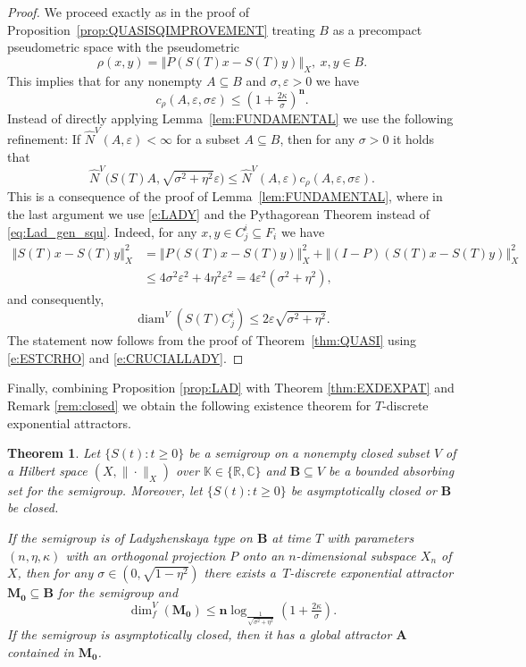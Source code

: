 \documentclass[a4paper,12pt,reqno]{amsart}
\theoremstyle{plain}
\newtheorem{thm}[lem]{Theorem}
\theoremstyle{definition}
\numberwithin{equation}{section}
\newcommand{\R}{\mathbb{R}}
\newcommand{\C}{\mathbb{C}}
\newcommand{\K}{\mathbb{K}}
\newcommand{\norm}[1]{\left\Vert#1\right\Vert}
\newcommand{\eps}{\varepsilon}
\newcommand{\diam}{\operatorname{diam}}
\newcommand{\dimf}{\operatorname{dim}_{f}}
\renewcommand{\geq}{\geqslant}
\renewcommand{\leq}{\leqslant}
\begin{document}
\begin{proof}
We proceed exactly as in the proof of Proposition~\ref{prop:QUASISQIMPROVEMENT} treating $B$ as a precompact pseudometric space with the pseudometric
$$\rho(x,y)=\norm{P(S(T)x-S(T)y)}_{X},\ x,y\in B.$$
This implies that for any nonempty $A\subseteq B$ and $\sigma,\eps>0$ we have
\begin{equation}\label{e:ESTCRHO}
c_\rho(A,\eps,\sigma\eps)\leq \left(1+\tfrac{2\kappa}{\sigma}\right)^{\mathbf{n}}.
\end{equation} 
Instead of directly applying Lemma~\ref{lem:FUNDAMENTAL} we use the following refinement: If $\widehat{N}^{V}(A,\eps)<\infty$ for a subset $A\subseteq B$, then for any $\sigma>0$ it holds that
\begin{equation}\label{e:CRUCIALLADY}
\widehat{N}^{V}\Big(S(T)A,\sqrt{\sigma^2+\eta^2}\eps\Big)\leq \widehat{N}^{V}(A,\eps)c_\rho(A,\eps,\sigma\eps).
\end{equation}
This is a consequence of the proof of Lemma~\ref{lem:FUNDAMENTAL}, where in the last argument we 
use \eqref{e:LADY} and the Pythagorean Theorem  instead of \eqref{eq:Lad_gen_squ}. 
Indeed, for any $x,y\in C_{j}^{i}\subseteq F_i$ we have
\begin{align*}
\norm{S(T)x-S(T)y}_{X}^2&=\norm{P(S(T)x-S(T)y)}_{X}^{2}+\norm{(I-P)(S(T)x-S(T)y)}_{X}^{2}\\
&\leq 4\sigma^2\eps^2+4\eta^2\eps^2=4\eps^2(\sigma^2+\eta^2),
\end{align*}
and consequently, 
$$\diam^{V}(S(T)C_{j}^{i})\leq2\eps\sqrt{\sigma^2+\eta^2}.$$
The statement now follows from the proof of 
Theorem~\ref{thm:QUASI} using \eqref{e:ESTCRHO} and \eqref{e:CRUCIALLADY}.
\end{proof}

Finally, combining Proposition \ref{prop:LAD} with Theorem \ref{thm:EXDEXPAT} and Remark \ref{rem:closed} we obtain the following existence theorem for $T$-discrete exponential attractors.

\begin{thm}
Let $\{S(t)\colon t\geq 0\}$ be a semigroup on a nonempty closed subset $V$ of a Hilbert space $(X,\|\cdot\|_{X})$ over $\K\in\{\R,\C\}$ and $\mathbf{B}\subseteq V$ be a bounded absorbing set for the semigroup. Moreover, let $\{S(t)\colon t\geq 0\}$ be asymptotically closed or $\mathbf{B}$ be closed. 

If the semigroup is of Ladyzhenskaya type on $\mathbf{B}$ at time $T$ with parameters $(n,\eta,\kappa)$ with an orthogonal projection $P$ onto an $n$-dimensional subspace $X_n$ of $X$, then for any  $\sigma \in (0,\sqrt{1-\eta^2})$ there exists a~$T$-discrete exponential attractor  $\mathbf{M_0}\subseteq \mathbf{B}$ for the semigroup and
\begin{equation*}
\dimf^{V}(\mathbf{M_0})\leq \mathbf{n}\log_{\tfrac{1}{ \sqrt{\sigma^2+\eta^2}}}\left(1+\tfrac{2\kappa}{\sigma}\right).
\end{equation*}
If the semigroup is asymptotically closed, then it has a global attractor $\mathbf{A}$  contained in $\mathbf{M_0}$.
\end{thm}
\end{document}
